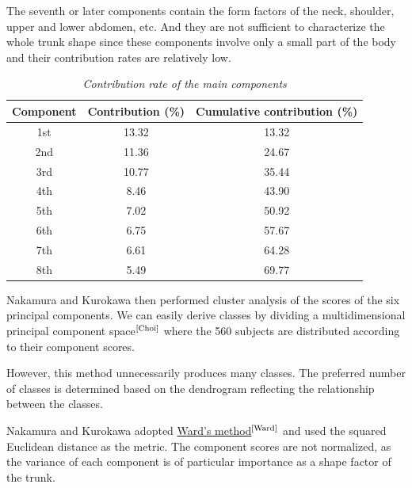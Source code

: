 \documentclass[12pt,a4paper,openany,UKenglish]{scrreprt}
\newcommand{\bib}[1]{$^\text{\cite{#1}}$}
\begin{document}
The seventh or later components contain the form factors of the neck, shoulder, upper and lower abdomen, etc.
And they are not sufficient to characterize the whole trunk shape since these components involve only a small part of the body and their contribution rates are relatively low.
\begin{table}[H]
	\centering
	\caption{\centering\itshape Contribution rate of the main components}
	{\small
		\begin{tabular}{ccc}
			\hline
			Component & Contribution (\%) & Cumulative contribution (\%) \\
			\hline\hline
			1st       & 13.32             & 13.32                        \\
			2nd       & 11.36             & 24.67                        \\
			3rd       & 10.77             & 35.44                        \\
			4th       & 8.46              & 43.90                        \\
			5th       & 7.02              & 50.92                        \\
			6th       & 6.75              & 57.67                        \\
			7th       & 6.61              & 64.28                        \\
			8th       & 5.49              & 69.77                        \\
			\hline
		\end{tabular}}
\end{table}

Nakamura and Kurokawa then performed cluster analysis of the scores of the six principal components. We can easily derive classes by dividing a multidimensional principal component space\bib{Choi} where the 560 subjects are distributed according to their component scores.

However, this method unnecessarily produces many classes. The preferred number of classes is determined based on the dendrogram reflecting the relationship between the classes.

Nakamura and Kurokawa adopted \href{https://en.wikipedia.org/wiki/Ward%27s_method}{Ward's method}\bib{Ward} and used the squared Euclidean distance as the metric. The component scores are not normalized, as the variance of each component is of particular importance as a shape factor of the trunk.
\end{document}
